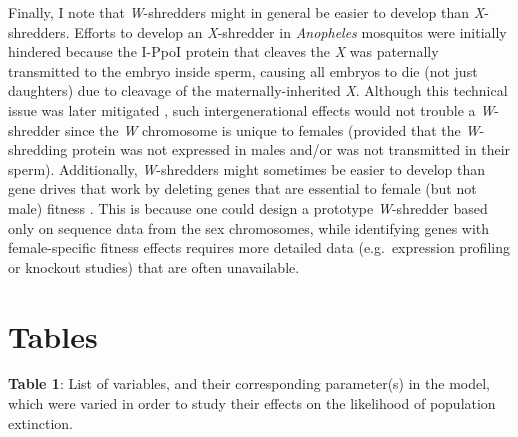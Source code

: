 \documentclass[]{rsos}%
\begin{document}
Finally, I note that \emph{W}-shredders might in general be easier to
develop than \emph{X}-shredders. Efforts to develop an \emph{X}-shredder
in \emph{Anopheles} mosquitos were initially hindered because the I-PpoI
protein that cleaves the \emph{X} was paternally transmitted to the
embryo inside sperm, causing all embryos to die (not just daughters) due
to cleavage of the maternally-inherited \emph{X}. Although this
technical issue was later mitigated \citep{galizi2014sy}, such
intergenerational effects would not trouble a \emph{W}-shredder since
the \emph{W} chromosome is unique to females (provided that the
\emph{W}-shredding protein was not expressed in males and/or was not
transmitted in their sperm). Additionally, \emph{W}-shredders might
sometimes be easier to develop than gene drives that work by deleting
genes that are essential to female (but not male) fitness
\citep[e.g.][]{burt2018se}. This is because one could design a prototype
\emph{W}-shredder based only on sequence data from the sex chromosomes,
while identifying genes with female-specific fitness effects requires
more detailed data (e.g.~expression profiling or knockout studies) that
are often unavailable.

\newpage

\hypertarget{tables}{%
\section{Tables}\label{tables}}

\textbf{Table 1}: List of variables, and their corresponding
parameter(s) in the model, which were varied in order to study their
effects on the likelihood of population extinction.
\end{document}
